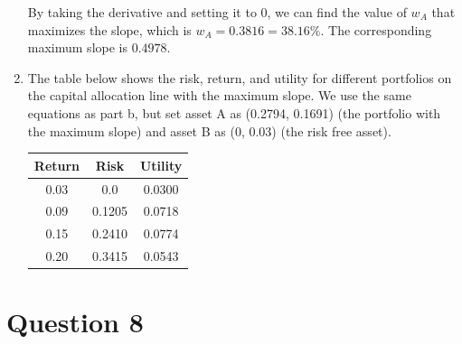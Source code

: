 \documentclass[a4paper]{article}
\begin{document}
\begin{enumerate}[label=(\alph*)]
    By taking the derivative and setting it to 0, we can find the value of $w_A$ that maximizes the slope, which is $w_A = 0.3816 = 38.16\%$. The corresponding maximum slope is $0.4978$.

    \vspace{5mm}
    \item The table below shows the risk, return, and utility for different portfolios on the capital allocation line with the maximum slope. We use the same equations as part b, but set asset A as (0.2794, 0.1691) (the portfolio with the maximum slope) and asset B as (0, 0.03) (the risk free asset).
    
    \begin{table}[ht]
        \centering
        \begin{tabular}{|c|c|c|}
            \hline
            Return & Risk & Utility \\
            \hline
            0.03 & 0.0 & 0.0300 \\
            \hline
            0.09 & 0.1205 & 0.0718 \\
            \hline
            0.15 & 0.2410 & 0.0774 \\
            \hline
            0.20 & 0.3415 & 0.0543 \\
            \hline
        \end{tabular}
    \end{table}

\end{enumerate}


\newpage

\section*{Question 8}
\end{document}
